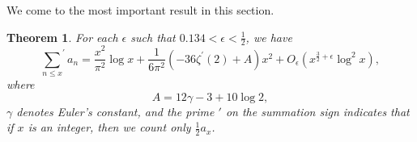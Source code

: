 \documentclass[11pt,reqno]{amsart}
\newcommand{\df}{\dfrac}
\theoremstyle{plain}
\numberwithin{equation}{section}
\newtheorem{theorem}{Theorem}[section]
\begin{document}

We come to the most important result in this section.

\begin{theorem}\label{important}
   For each $\epsilon$ such that $0.134<\epsilon<\frac{1}{2}$, we have
    \begin{equation*}\label{f6}
        {\sum_{n\leq x}}^{\prime}a_n  =\dfrac{x^2}{\pi^2}\log x+\df{1}{6\pi^2}\left(-36\zeta^{\prime}(2)+A\right)x^2+O_{\epsilon}\left(x^{\frac{3}{2}+\epsilon}\log^2 x\right),
        \end{equation*}
        where
        \begin{equation*}
        A=12\gamma-3+10\log 2,
        \end{equation*}
        $\gamma$ denotes Euler's constant,
    and the prime $'$ on the summation sign indicates that if $x$ is an integer, then we count only $\frac{1}{2}a_x$.
\end{theorem}
\end{document}
